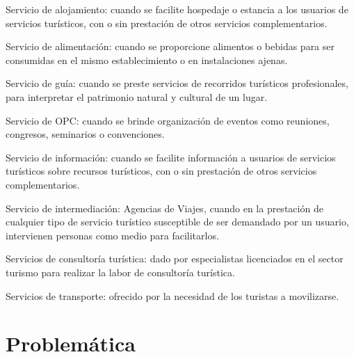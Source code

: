 \begin{table}
	
	 Servicio de alojamiento: cuando se facilite hospedaje o estancia a los usuarios de servicios turísticos, con o sin prestación de otros servicios complementarios.
	
	 Servicio de alimentación: cuando se proporcione alimentos o bebidas para ser consumidas en el mismo establecimiento o en instalaciones ajenas.
	
	 Servicio de guía: cuando se preste servicios de recorridos turísticos profesionales, para interpretar el patrimonio natural y cultural de un lugar.
	
	 Servicio de OPC: cuando se brinde organización de eventos como reuniones, congresos, seminarios o convenciones.
	
	 Servicio de información: cuando se facilite información a usuarios de servicios turísticos sobre recursos turísticos, con o sin prestación de otros servicios complementarios.
	
	 Servicio de intermediación: Agencias de Viajes, cuando en la prestación de cualquier tipo de servicio turístico susceptible de ser demandado por un usuario, intervienen personas como medio para facilitarlos.
	
	 Servicios de consultoría turística: dado por especialistas licenciados en el sector turismo para realizar la labor de consultoría turística.
	
	 Servicios de transporte: ofrecido por la necesidad de los turistas a movilizarse.
	
\end{table}




\section{Problemática}


